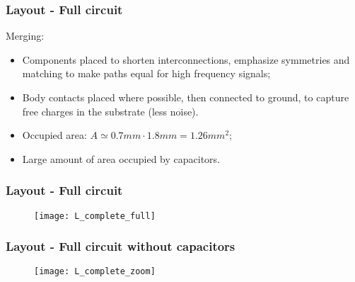\begin{frame}
	\frametitle{Layout - Full circuit}
	Merging:
	\begin{itemize}
		\item Components placed to shorten interconnections, emphasize symmetries and matching to make paths equal for high frequency signals;
		\item Body contacts placed where possible, then connected to ground, to capture free charges in the substrate (less noise).
		\item Occupied area: $A\simeq0.7mm \cdot 1.8mm = 1.26 mm^2$;
		\item Large amount of area occupied by capacitors.
	\end{itemize}
\end{frame}

\begin{frame}
	\frametitle{Layout - Full circuit}
	\begin{figure}[H]
		\centering
		\texttt{[image: L\_complete\_full]}
		\label{L_complete_full}
	\end{figure}
\end{frame}

\begin{frame}
	\frametitle{Layout - Full circuit without capacitors}
	\begin{figure}[H]
		\centering
		\texttt{[image: L\_complete\_zoom]}
		\label{L_complete_zoom}
	\end{figure}
\end{frame}